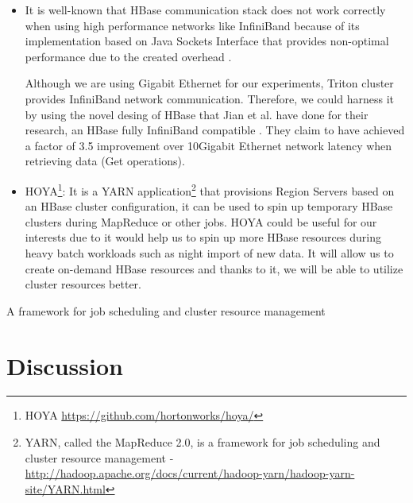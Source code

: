 \begin{itemize}
\item  It is well-known that HBase communication stack does not work correctly when using high performance networks like InfiniBand because of its implementation based on Java Sockets Interface that provides non-optimal performance due to the created overhead \cite{wasi2012understanding}. 
\par
Although we are using Gigabit Ethernet for our experiments, Triton cluster provides InfiniBand network communication. Therefore, we could harness it by using the novel desing of HBase that Jian et al. have done for their research, an HBase fully InfiniBand compatible  \cite{huang2012high}. They claim to have achieved a factor of 3.5 improvement over 10Gigabit Ethernet network latency when retrieving data (Get operations).
\item HOYA\footnote{HOYA \url{https://github.com/hortonworks/hoya/}}: It is a YARN application\footnote{YARN, called the MapReduce 2.0, is a framework for job scheduling and cluster resource management - \url{http://hadoop.apache.org/docs/current/hadoop-yarn/hadoop-yarn-site/YARN.html}} that provisions Region Servers based on an HBase cluster configuration, it can be used to spin up temporary HBase clusters during MapReduce or other jobs. HOYA could be useful for our interests due to it would help us to spin up more HBase resources during heavy batch workloads such as night import of new data. It will allow us to create on-demand HBase resources and thanks to it, we will be able to utilize cluster resources better.

\end{itemize}
A framework for job scheduling and cluster resource management


\section{Discussion}

